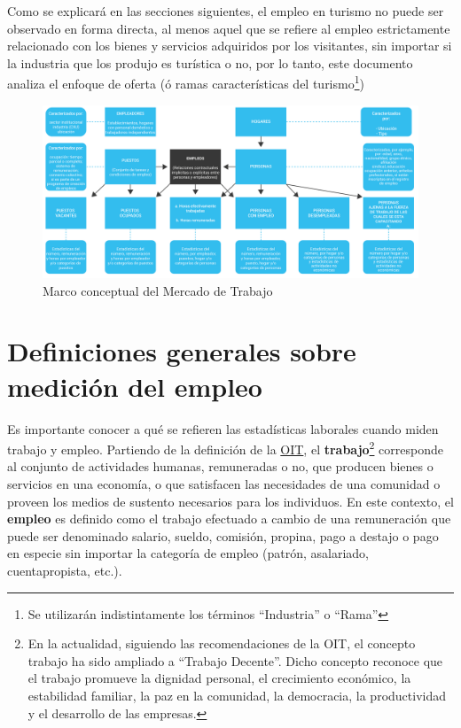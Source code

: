 \documentclass[
  openany]{book}
\begin{document}
Como se explicará en las secciones siguientes, el empleo en turismo no puede ser observado en forma directa, al menos aquel que se refiere al empleo estrictamente relacionado con los bienes y servicios adquiridos por los visitantes, sin importar si la industria que los produjo es turística o no, por lo tanto, este documento analiza el enfoque de oferta (ó ramas características del turismo\footnote{Se utilizarán indistintamente los términos ``Industria'' o ``Rama''})

\begin{figure}

{\centering \includegraphics[width=0.8\linewidth]{imagenes/figura2.1} 

}

\caption{Marco conceptual del Mercado de Trabajo}\label{fig:empleooit}
\end{figure}

\hypertarget{definiciones-generales-sobre-mediciuxf3n-del-empleo}{%
\section{Definiciones generales sobre medición del empleo}\label{definiciones-generales-sobre-mediciuxf3n-del-empleo}}

Es importante conocer a qué se refieren las estadísticas laborales cuando miden trabajo y empleo. Partiendo de la definición de la \href{https://www.ilo.org/global/lang--es/index.htm}{OIT}, el \textbf{trabajo}\footnote{En la actualidad, siguiendo las recomendaciones de la OIT, el concepto trabajo ha sido ampliado a ``Trabajo Decente''. Dicho concepto reconoce que el trabajo promueve la dignidad personal, el crecimiento económico, la estabilidad familiar, la paz en la comunidad, la democracia, la productividad y el desarrollo de las empresas.} corresponde al conjunto de actividades humanas, remuneradas o no, que producen bienes o servicios en una economía, o que satisfacen las necesidades de una comunidad o proveen los medios de sustento necesarios para los individuos. En este contexto, el \textbf{empleo} es definido como el trabajo efectuado a cambio de una remuneración que puede ser denominado salario, sueldo, comisión, propina, pago a destajo o pago en especie sin importar la categoría de empleo (patrón, asalariado, cuentapropista, etc.).
\end{document}
